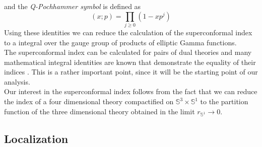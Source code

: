 and the \emph{Q-Pochhammer symbol} is defined as
\begin{equation}
(x;p) = \prod_{j \geq 0} ( 1- x p^j)
\end{equation}
Using these identities we can reduce the calculation of the superconformal index to a integral over the gauge group of products of elliptic Gamma functions.\\
The superconformal index can be calculated for pairs of dual theories and many mathematical integral identities are known that demonstrate the equality of their indices \cite{rains309252transformations} \cite{Dolan:2008qi}. 
This is a rather important point, since it will be the starting point of our analysis.\\
Our interest in the superconformal index follows from the fact that we can reduce the index of a four dimensional theory compactified on $\mathbb{S}^3 \times \mathbb{S}^1$ to the partition function of the three dimensional theory obtained in the limit $r_{\mathbb{S}^1} \rightarrow 0$.

\subsection{Localization}



